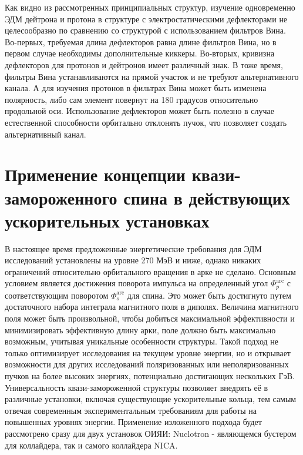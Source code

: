 \par  Как видно из рассмотренных принципиальных структур, изучение одновременно ЭДМ дейтрона и протона в структуре с электростатическими дефлекторами не целесообразно по сравнению со структурой с использованием фильтров Вина. Во-первых, требуемая длина дефлекторов равна длине фильтров Вина, но в первом случае необходимы дополнительные киккеры. Во-вторых, кривизна дефлекторов для протонов и дейтронов имеет различный знак. В тоже время, фильтры Вина устанавливаются на прямой участок и не требуют альтернативного канала. А для изучения протонов в фильтрах Вина может быть изменена полярность, либо сам элемент повернут на 180 градусов относительно продольной оси. Использование дефлекторов может быть полезно в случае естественной способности орбитально отклонять пучок, что позволяет создать альтернативный канал.

	\section{Применение концепции квази-замороженного спина в действующих ускорительных установках}\label{sec:EDM/nuclotron}

\par В настоящее время предложенные энергетические требования для ЭДМ исследований установлены на уровне 270 МэВ и ниже, однако никаких ограничений относительно орбитального вращения в арке не сделано. Основным условием является достижения поворота импульса на определенный угол $\Phi_p^{\textrm{arc}}$ с соответствующим поворотом $\Phi_s^{\textrm{arc}}$ для спина. Это может быть достигнуто путем достаточного набора интеграла магнитного поля в диполях. Величина магнитного поля может быть произвольной, чтобы добиться максимальной эффективности и минимизировать эффективную длину арки, поле должно быть максимально возможным, учитывая уникальные особенности структуры. Такой подход не только оптимизирует исследования на текущем уровне энергии, но и открывает возможности для других исследований поляризованных или неполяризованных пучков на более высоких энергиях, потенциально достигающих нескольких ГэВ. Универсальность квази-замороженной структуры позволяет внедрять её в различные установки, включая существующие ускорительные кольца, тем самым отвечая современным экспериментальным требованиям для работы на повышенных уровнях энергии. Применение изложенного подхода будет рассмотрено сразу для двух установок ОИЯИ: Nuclotron - являющемся бустером для коллайдера, так и самого коллайдера NICA. 

